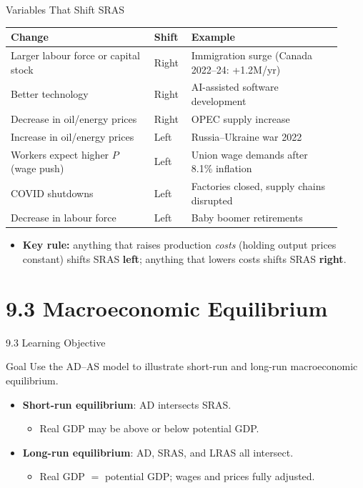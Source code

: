 \documentclass[aspectratio=169]{beamer}
\begin{document}
\begin{frame}{Variables That Shift SRAS}
\transfade
\begin{center}
\small
\begin{tabular}{p{0.40\linewidth} p{0.10\linewidth} p{0.42\linewidth}}
\toprule
\textbf{Change} & \textbf{Shift} & \textbf{Example} \\
\midrule
Larger labour force or capital stock & Right & Immigration surge (Canada 2022--24: +1.2M/yr) \\
Better technology & Right & AI-assisted software development \\
Decrease in oil/energy prices & Right & OPEC supply increase \\
Increase in oil/energy prices & Left & Russia--Ukraine war 2022 \\
Workers expect higher $P$ (wage push) & Left & Union wage demands after 8.1\% inflation \\
COVID shutdowns & Left & Factories closed, supply chains disrupted \\
Decrease in labour force & Left & Baby boomer retirements \\
\bottomrule
\end{tabular}
\end{center}
\vspace{0.3em}
\begin{itemize}
  \item \textbf{Key rule:} anything that raises production \textit{costs} (holding output prices constant) shifts SRAS \textbf{left}; anything that lowers costs shifts SRAS \textbf{right}.
\end{itemize}
\end{frame}

\section{9.3 Macroeconomic Equilibrium}

\begin{frame}{9.3 Learning Objective}
\transfade
\begin{block}{Goal}
Use the AD--AS model to illustrate short-run and long-run macroeconomic equilibrium.
\end{block}
\begin{itemize}
  \item \textbf{Short-run equilibrium}: AD intersects SRAS.
  \begin{itemize}
    \item Real GDP may be above or below potential GDP.
  \end{itemize}
  \item \textbf{Long-run equilibrium}: AD, SRAS, and LRAS all intersect.
  \begin{itemize}
    \item Real GDP $=$ potential GDP; wages and prices fully adjusted.
  \end{itemize}
\end{itemize}
\end{frame}
\end{document}
